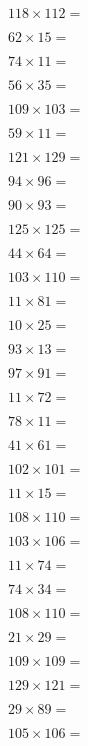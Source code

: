 \documentclass{numbersense}
\begin{document}
\begin{questions}
\q[13216] $118 \times 112 = $\ans

\q[930] $62 \times 15 = $\ans

\q[814] $74 \times 11 = $\ans

\q[1960] $56 \times 35 = $\ans

\q[11227] $109 \times 103 = $\ans

\q[649] $59 \times 11 = $\ans

\q[15609] $121 \times 129 = $\ans

\q[9024] $94 \times 96 = $\ans

\q[8370] $90 \times 93 = $\ans

\q[15625] $125 \times 125 = $\ans

\q[2816] $44 \times 64 = $\ans

\q[11330] $103 \times 110 = $\ans

\q[891] $11 \times 81 = $\ans

\q[250] $10 \times 25 = $\ans

\q[1209] $93 \times 13 = $\ans

\q[8827] $97 \times 91 = $\ans

\q[792] $11 \times 72 = $\ans

\q[858] $78 \times 11 = $\ans

\q[2501] $41 \times 61 = $\ans

\q[10302] $102 \times 101 = $\ans

\q[165] $11 \times 15 = $\ans

\q[11880] $108 \times 110 = $\ans

\q[10918] $103 \times 106 = $\ans

\q[814] $11 \times 74 = $\ans

\q[2516] $74 \times 34 = $\ans

\q[11880] $108 \times 110 = $\ans

\q[609] $21 \times 29 = $\ans

\q[11881] $109 \times 109 = $\ans

\q[15609] $129 \times 121 = $\ans

\q[2581] $29 \times 89 = $\ans

\q[11130] $105 \times 106 = $\ans


\end{questions}
\end{document}
